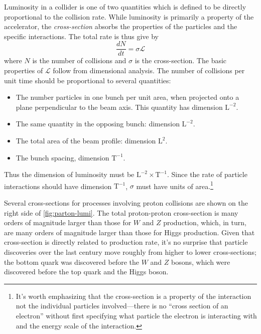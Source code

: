 Luminosity in a collider is one of two quantities which is defined to be directly proportional to the collision rate.
While luminosity is primarily a property of the accelerator, the \emph{cross-section} absorbs the properties of the particles and the specific interactions.
The total rate is thus give by
\begin{equation}
  \frac{d N}{d t} = \sigma \mathcal{L}
  \label{eq:lumi-cross-section}
\end{equation}
where $N$ is the number of collisions and $\sigma$ is the cross-section.
The basic properties of $\mathcal{L}$ follow from dimensional analysis.
The number of collisions per unit time should be proportional to several quantities:
\begin{itemize}
\item The number particles in one bunch per unit area, when projected onto a plane perpendicular to the beam axis. This quantity has dimension $\mathrm{L}^{-2}$.
\item The same quantity in the opposing bunch: dimension $\mathrm{L}^{-2}$.
\item The total area of the beam profile: dimension $\mathrm{L}^2$.
\item The bunch spacing, dimension $\mathrm{T}^{-1}$.
\end{itemize}
Thus the dimension of luminosity must be $\mathrm{L}^{-2} \times \mathrm{T}^{-1}$.
Since the rate of particle interactions should have dimension $\mathrm{T}^{-1}$, $\sigma$ must have units of area.\footnote{%
It's worth emphasizing that
the cross-section is a property of the interaction not the individual particles involved---there is no ``cross section of an electron'' without first specifying what particle the electron is interacting with and the energy scale of the interaction.}

Several cross-sections for processes involving proton collisions are shown on the right side of \cref{fig:parton-lumi}.
The total proton-proton cross-section is many orders of magnitude larger than those for $W$ and $Z$ production, which, in turn, are many orders of magnitude larger than those for Higgs production.
Given that cross-section is directly related to production rate, it's no surprise that particle discoveries over the last century move roughly from higher to lower cross-sections; the bottom quark was discovered before the $W$ and $Z$ bosons, which were discovered before the top quark and the Higgs boson.

